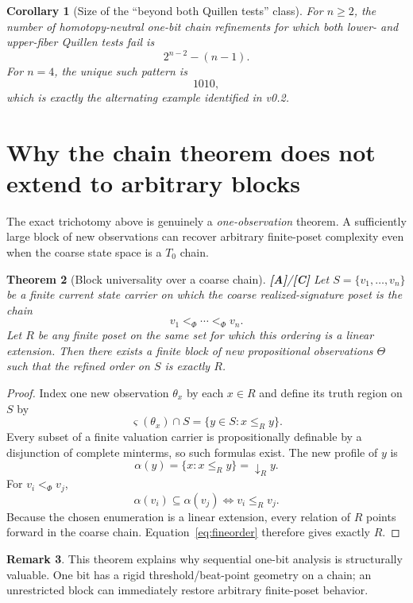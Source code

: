 \documentclass[11pt]{article}
\newtheorem{theorem}{Theorem}[section]
\newtheorem{corollary}[theorem]{Corollary}
\theoremstyle{definition}
\newtheorem{remark}[theorem]{Remark}
\newcommand{\truth}{\varsigma}
\newcommand{\down}{\downarrow}
\newcommand{\statusA}{\textbf{[A]}}
\newcommand{\statusC}{\textbf{[C]}}
\begin{document}
\begin{corollary}[Size of the ``beyond both Quillen tests'' class]
For $n\ge2$, the number of homotopy-neutral one-bit chain refinements for which both lower- and upper-fiber Quillen tests fail is
\[
2^{n-2}-(n-1).
\]
For $n=4$, the unique such pattern is
\[
1010,
\]
which is exactly the alternating example identified in v0.2.
\end{corollary}

\section{Why the chain theorem does not extend to arbitrary blocks}

The exact trichotomy above is genuinely a \emph{one-observation} theorem. A sufficiently large block of new observations can recover arbitrary finite-poset complexity even when the coarse state space is a $T_0$ chain.

\begin{theorem}[Block universality over a coarse chain]\label{thm:chainuniversal}
\statusA/\statusC\;
Let $S=\{v_1,\dots,v_n\}$ be a finite current state carrier on which the coarse realized-signature poset is the chain
\[
v_1<_\Phi\cdots<_\Phi v_n.
\]
Let $R$ be any finite poset on the same set for which this ordering is a linear extension. Then there exists a finite block of new propositional observations $\Theta$ such that the refined order on $S$ is exactly $R$.
\end{theorem}

\begin{proof}
Index one new observation $\theta_x$ by each $x\in R$ and define its truth region on $S$ by
\[
\truth(\theta_x)\cap S=\{y\in S:x\le_R y\}.
\]
Every subset of a finite valuation carrier is propositionally definable by a disjunction of complete minterms, so such formulas exist. The new profile of $y$ is
\[
\alpha(y)=\{x:x\le_R y\}=\down_R y.
\]
For $v_i<_\Phi v_j$,
\[
\alpha(v_i)\subseteq\alpha(v_j)
\iff
v_i\le_R v_j.
\]
Because the chosen enumeration is a linear extension, every relation of $R$ points forward in the coarse chain. Equation~\eqref{eq:fineorder} therefore gives exactly $R$.
\end{proof}

\begin{remark}
This theorem explains why sequential one-bit analysis is structurally valuable. One bit has a rigid threshold/beat-point geometry on a chain; an unrestricted block can immediately restore arbitrary finite-poset behavior.
\end{remark}
\end{document}
